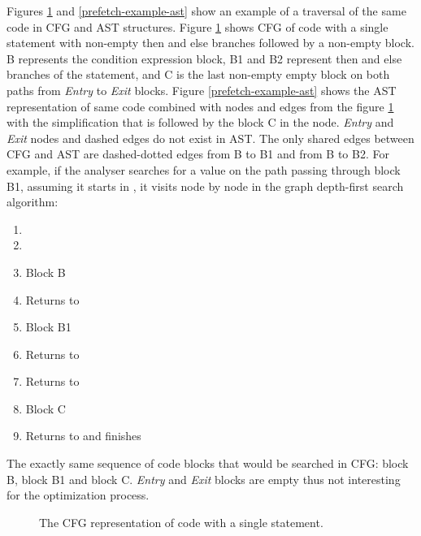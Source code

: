 Figures \ref{prefetch-example-cfg} and \ref{prefetch-example-ast} show an example of a traversal of the same code in CFG and AST structures. Figure \ref{prefetch-example-cfg} shows CFG of code with a single  statement with non-empty then and else branches followed by a non-empty block. B represents the condition expression block, B1 and B2 represent then and else branches of the  statement, and C is the last non-empty empty block on both paths from \emph{Entry} to \emph{Exit} blocks. Figure \ref{prefetch-example-ast} shows the AST representation of same code combined with nodes and edges from the figure \ref{prefetch-example-cfg} with the simplification that  is followed by the block C in the  node. \emph{Entry} and \emph{Exit} nodes and dashed edges do not exist in AST. The only shared edges between CFG and AST are dashed-dotted edges from B to B1 and from B to B2. For example, if the analyser searches for a value on the path passing through block B1, assuming it starts in , it visits node by node in the graph depth-first search algorithm:

\begin{enumerate}
\item {}
\item {}
\item Block B
\item Returns to 
\item Block B1
\item Returns to 
\item Returns to 
\item Block C
\item Returns to  and finishes
\end{enumerate}

The exactly same sequence of code blocks that would be searched in CFG: block B, block B1 and block C. \emph{Entry} and \emph{Exit} blocks are empty thus not interesting for the optimization process.

\begin{figure}[h!]
\vspace{.5cm}
\centering
{}
\caption{The CFG representation of code with a single  statement.}
\label{prefetch-example-cfg}
\end{figure}

